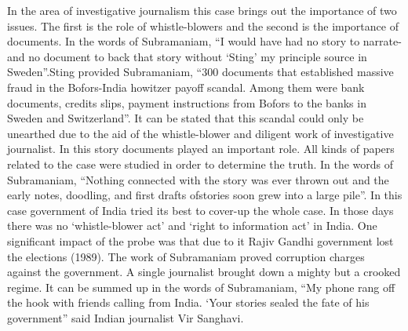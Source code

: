 \begin{multicols}{2}
\noi
In the area of investigative journalism this case brings out the importance of two issues. The
first is the role of whistle-blowers and the second is the importance of documents. In the words
of Subramaniam, “I would have had no story to narrate-and no document to back that story
without ‘Sting’ my principle source in Sweden”.Sting provided Subramaniam, “300 documents
that established massive fraud in the Bofors-India howitzer payoff scandal. Among them were
bank documents, credits slips, payment instructions from Bofors to the banks in Sweden and
Switzerland”. It can be stated that this scandal could only be unearthed due to the aid of the
whistle-blower and diligent work of investigative journalist. In this story documents played an
important role. All kinds of papers related to the case were studied in order to determine the
truth. In the words of Subramaniam, “Nothing connected with the story was ever thrown out
and the early notes, doodling, and first drafts ofstories soon grew into a large pile”. In this case
government of India tried its best to cover-up the whole case. In those days there was no
‘whistle-blower act’ and ‘right to information act’ in India. One significant impact of the probe
was that due to it Rajiv Gandhi government lost the elections (1989). The work of
Subramaniam proved corruption charges against the government. A single journalist brought
down a mighty but a crooked regime. It can be summed up in the words of Subramaniam, “My
phone rang off the hook with friends calling from India. ‘Your stories sealed the fate of his
government” said Indian journalist Vir Sanghavi.

\vspace{-.15cm}


\end{multicols}
